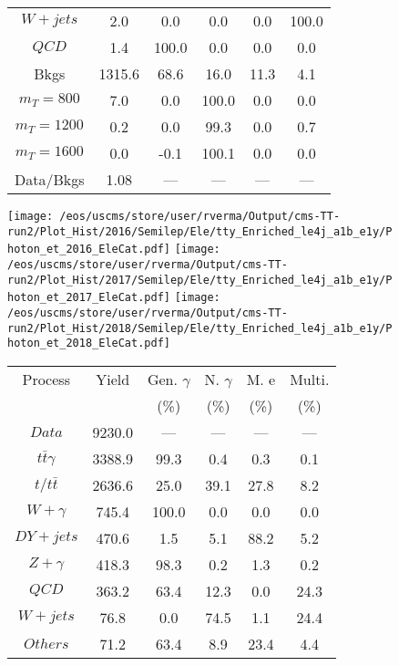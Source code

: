 \begin{figure}
\begin{minipage}[c]{0.32\textwidth}
{\begin{tabular}{cccccc}
$ W+jets $ &  2.0 &  0.0 &  0.0 &  0.0 &  100.0\\
$ QCD $ &  1.4 &  100.0 &  0.0 &  0.0 &  0.0\\
Bkgs &  1315.6 &  68.6 &  16.0 &  11.3 &  4.1\\
$ m_{T} = 800 $ &  7.0 &  0.0 &  100.0 &  0.0 &  0.0\\
$ m_{T} = 1200 $ &  0.2 &  0.0 &  99.3 &  0.0 &  0.7\\
$ m_{T} = 1600 $ &  0.0 &  -0.1 &  100.1 &  0.0 &  0.0\\
Data/Bkgs &  1.08 &  --- &  --- &  --- &  ---\\
\hline
\end{tabular}
}
\end{minipage}
\end{figure}

\begin{figure}
\centering
\texttt{[image: /eos/uscms/store/user/rverma/Output/cms-TT-run2/Plot\_Hist/2016/Semilep/Ele/tty\_Enriched\_le4j\_a1b\_e1y/Photon\_et\_2016\_EleCat.pdf]}
\texttt{[image: /eos/uscms/store/user/rverma/Output/cms-TT-run2/Plot\_Hist/2017/Semilep/Ele/tty\_Enriched\_le4j\_a1b\_e1y/Photon\_et\_2017\_EleCat.pdf]}
\texttt{[image: /eos/uscms/store/user/rverma/Output/cms-TT-run2/Plot\_Hist/2018/Semilep/Ele/tty\_Enriched\_le4j\_a1b\_e1y/Photon\_et\_2018\_EleCat.pdf]}
\begin{minipage}[c]{0.32\textwidth}
\centering
\tiny{
\begin{tabular}{cccccc}
\hline
Process & Yield & Gen. $\gamma$ & N. $\gamma$ & M. e & Multi. \\
 &  & (\%) & (\%) & (\%) & (\%)  \\
\hline
                                                                      $ Data $ &  9230.0 &  --- &  --- &  --- &  ---\\
$ t\bar{t}\gamma $ &  3388.9 &  99.3 &  0.4 &  0.3 &  0.1\\
$ t/t\bar{t} $ &  2636.6 &  25.0 &  39.1 &  27.8 &  8.2\\
$ W+\gamma $ &  745.4 &  100.0 &  0.0 &  0.0 &  0.0\\
$ DY+jets $ &  470.6 &  1.5 &  5.1 &  88.2 &  5.2\\
$ Z+\gamma $ &  418.3 &  98.3 &  0.2 &  1.3 &  0.2\\
$ QCD $ &  363.2 &  63.4 &  12.3 &  0.0 &  24.3\\
$ W+jets $ &  76.8 &  0.0 &  74.5 &  1.1 &  24.4\\
$ Others $ &  71.2 &  63.4 &  8.9 &  23.4 &  4.4\\

\end{tabular}}
\end{minipage}
\end{figure}
